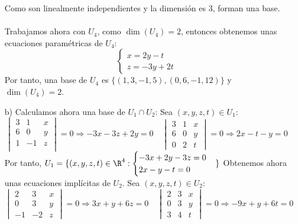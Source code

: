 \begin{ejercicio}
\begin{enumerate}
    Como son linealmente independientes y la dimensión es 3, forman una base.
    \\ \\
    Trabajamos ahora con $U_4$, como $\dim(U_4) = 2$, entonces obtenemos unas ecuaciones paramétricas de $U_4$:
    \begin{equation*}
        \begin{cases}
            x = 2y - t \\
            z = -3y + 2t
        \end{cases}
    \end{equation*}
    Por tanto, una base de $U_4$ es $\{(1,3, -1, 5), (0, 6, -1, 12)\}$ y $\dim(U_4) = 2$.
    \item[b)] Calculamos ahora una base de $U_1 \cap U_2$:
    Sea $(x,y,z,t) \in U_1$: 
    \begin{equation*}
        \begin{vmatrix}
            3 & 1 & x \\
            6 & 0 & y \\
            1 & -1 & z \\
        \end{vmatrix} = 0 \Rightarrow -3x -3z + 2y = 0 \quad 
        \begin{vmatrix}
            3 & 1 & x \\
            6 & 0 & y \\
            0 & 2 & t 
        \end{vmatrix} = 0 \Rightarrow 2x - t - y = 0
    \end{equation*}
    Por tanto, $U_1 = \{(x,y,z,t) \in \R^4 : \begin{cases}
        -3x + 2y - 3z = 0 \\
        2x - y - t = 0
    \end{cases}\}$
    Obtenemos ahora unas ecuaciones implícitas de $U_2$. Sea $(x,y,z,t) \in U_2$:
    \begin{equation*}
        \begin{vmatrix}
            2 & 3 & x \\
            0 & 3 & y \\
            -1 & -2 & z
        \end{vmatrix} = 0 \Rightarrow 3x + y + 6z = 0 \quad 
        \begin{vmatrix}
            2 & 3 & x \\
            0 & 3 & y \\
            3 & 4 & t
        \end{vmatrix} = 0 \Rightarrow -9x + y + 6t = 0

\end{equation*}
\end{enumerate}
\end{ejercicio}
